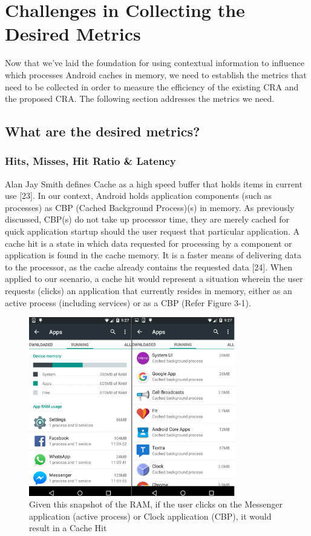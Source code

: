 \documentclass[12pt]{uthesis-v12}  %
\begin{document}
\chapter{Challenges in Collecting the Desired Metrics}
	Now that we've laid the foundation for using contextual information to influence which processes Android caches in memory, we need to establish the metrics that need to be collected in order to measure the efficiency of the existing CRA and the proposed CRA. The following section addresses the metrics we need.
	
	\section{What are the desired metrics?}
		
		\subsection{Hits, Misses, Hit Ratio \& Latency}
			Alan Jay Smith defines Cache as a high speed buffer that holds items in current use [23]. In our context, Android holds application components (such as processes) as CBP (Cached Background Process)(s) in memory. As previously discussed, CBP(s) do not take up processor time, they are merely cached for quick application startup should the user request that particular application. A cache hit is a state in which data requested for processing by a component or application is found in the cache memory. It is a faster means of delivering data to the processor, as the cache already contains the requested data [24]. When applied to our scenario, a cache hit would represent a situation wherein the user requests (clicks) an application that currently resides in memory, either as an active process (including services) or as a CBP (Refer Figure 3-1).  
			
			\begin{figure}[!ht]
				\centering
				\includegraphics[width = 90mm]{images/runningApps.png}
				\caption[Running Apps and CBP(s) - Cache Hit]
				{Given this snapshot of the RAM, if the user clicks on the Messenger application (active process) or Clock application (CBP), it would result in a Cache Hit}
			\end{figure}
			
\end{document}
